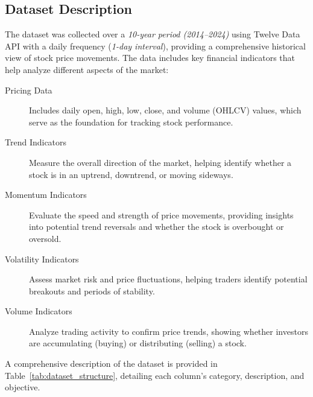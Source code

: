 \clearpage
\subsection{Dataset Description}
\label{app:dataset}
The dataset was collected over a \emph{10-year period (2014–2024)} 
using Twelve Data API with a daily frequency (\emph{1-day interval}), providing a
comprehensive historical view of stock price movements. The data includes key financial
indicators that help analyze different aspects of the market:

\begin{description}
    \item[Pricing Data] Includes daily open, high, low, close, and volume (OHLCV) values,
    which serve as the foundation for tracking stock performance.
    \item[Trend Indicators] Measure the overall direction of the market, helping identify 
    whether a stock is in an uptrend, downtrend, or moving sideways.
    \item[Momentum Indicators] Evaluate the speed and strength of price movements, providing
    insights into potential trend reversals and whether the stock is overbought or oversold.
    \item[Volatility Indicators] Assess market risk and price fluctuations, helping traders 
    identify potential breakouts and periods of stability.
    \item[Volume Indicators] Analyze trading activity to confirm price trends, showing
    whether investors are accumulating (buying) or distributing (selling) a stock.
\end{description}

A comprehensive description of the dataset is provided in Table~\ref{tab:dataset_structure}, detailing each column's category, description, and objective.

